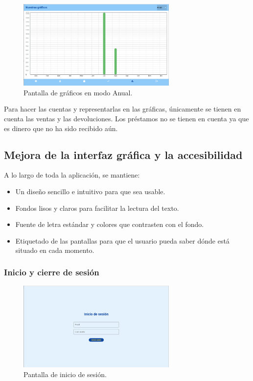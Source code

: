 \begin{figure}[H]
	\centering
	\includegraphics[width=0.7\textwidth]{imagenes/TerceraIteracion/graficosAnual.png}
	\caption{Pantalla de gráficos en modo Anual.}
	\label{fig:anual}
\end{figure}

Para hacer las cuentas y representarlas en las gráficas, únicamente se tienen en cuenta las ventas y las devoluciones. Los préstamos no se tienen en cuenta ya que es dinero que no ha sido recibido aún. 



\subsection{Mejora de la interfaz gráfica y la accesibilidad}

A lo largo de toda la aplicación, se mantiene: 

\begin{itemize}
	\item Un diseño sencillo e intuitivo para que sea usable.
	\item Fondos lisos y claros para facilitar la lectura del texto. 
	\item Fuente de letra estándar y colores que contrasten con el fondo.  
	\item Etiquetado de las pantallas para que el usuario pueda saber dónde está situado en cada momento. 
\end{itemize}

\subsubsection{Inicio y cierre de sesión}

\begin{figure}[H]
	\centering
	\includegraphics[width=0.7\textwidth]{imagenes/TerceraIteracion/login.png}
	\caption{Pantalla de inicio de sesión.}
\end{figure}

